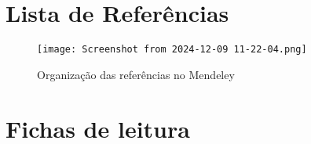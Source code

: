 \documentclass[
	article,
	11pt,
	oneside,
	a4paper,
	english,
	brazil,
	sumario=tradicional
	]{abntex2}
\begin{document}
\section{Lista de Referências}
\vspace{-4.5em} %
{
    \renewcommand{\bibname}{}
    
    
}

\begin{figure}
    \centering
    \texttt{[image: Screenshot from 2024-12-09 11-22-04.png]}
    \caption{Organização das referências no Mendeley}
    \label{fig:enter-label}
\end{figure}

\section{Fichas de leitura}
\end{document}
